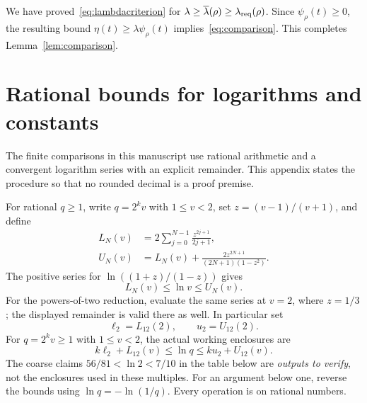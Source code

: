 We have proved~\eqref{eq:lambdacriterion} for $\lambda\ge\overline\lambda(\rho)\ge\lambda_{\rm req}(\rho)$. Since $\psi_\rho(t)\ge0$, the resulting bound $\eta(t)\ge\lambda\psi_\rho(t)$ implies~\eqref{eq:comparison}. This completes Lemma~\ref{lem:comparison}.

\section{Rational bounds for logarithms and constants}\label{app:constants}
The finite comparisons in this manuscript use rational arithmetic and a convergent logarithm series with an explicit remainder. This appendix states the procedure so that no rounded decimal is a proof premise.

For rational $q\ge1$, write $q=2^kv$ with $1\le v<2$, set $z=(v-1)/(v+1)$, and define
\begin{align*}
L_N(v)&=2\sum_{j=0}^{N-1}\frac{z^{2j+1}}{2j+1},\\
U_N(v)&=L_N(v)+\frac{2z^{2N+1}}{(2N+1)(1-z^2)}.
\end{align*}
The positive series for $\ln((1+z)/(1-z))$ gives
\begin{equation}\label{eq:logbounds}
L_N(v)\le\ln v\le U_N(v).
\end{equation}
For the powers-of-two reduction, evaluate the same series at $v=2$, where $z=1/3$; the displayed remainder is valid there as well. In particular set
\[
\ell_2=L_{12}(2),\qquad u_2=U_{12}(2).
\]
For $q=2^kv\ge1$ with $1\le v<2$, the actual working enclosures are
\[
k\ell_2+L_{12}(v)\le\ln q\le ku_2+U_{12}(v).
\]
The coarse claims $56/81<\ln2<7/10$ in the table below are \emph{outputs to verify}, not the enclosures used in these multiples. For an argument below one, reverse the bounds using $\ln q=-\ln(1/q)$. Every operation is on rational numbers.

